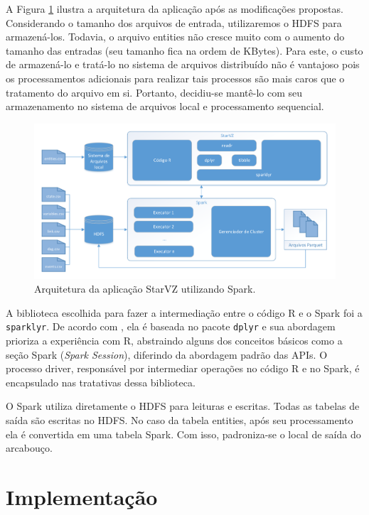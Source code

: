 A Figura \ref{fig:starvz-app-spark} ilustra a arquitetura da aplicação após as 
modificações propostas. Considerando o tamanho dos arquivos de entrada, 
utilizaremos o HDFS para armazená-los. Todavia, o arquivo entities não cresce 
muito com o aumento do tamanho das entradas (seu tamanho fica na ordem de 
KBytes). Para este, o custo de armazená-lo e tratá-lo no sistema de arquivos 
distribuído não é vantajoso pois os processamentos adicionais para realizar tais 
processos são mais caros que o tratamento do arquivo em si. Portanto, decidiu-se 
mantê-lo com seu armazenamento no sistema de arquivos local e processamento 
sequencial.

\begin{figure}[ht]
 \centerline{\includegraphics[width=1\textwidth]{./img/starvz-arch-spark.pdf}}
 \caption{Arquitetura da aplicação StarVZ utilizando Spark.}
 \label{fig:starvz-app-spark}
\end{figure}


A biblioteca escolhida para fazer a intermediação entre o código R e o Spark 
foi a \texttt{sparklyr}. De acordo com \citet{ref:sparkbook}, ela é 
baseada no pacote \texttt{dplyr} e sua abordagem prioriza a experiência com R, 
abstraindo alguns dos conceitos básicos como a seção Spark (\emph{Spark 
Session}), diferindo da abordagem padrão das APIs. O processo driver, 
responsável por intermediar operações no código R e no Spark, é encapsulado nas 
tratativas dessa biblioteca. 

O Spark utiliza diretamente o HDFS para leituras e escritas. Todas as tabelas 
de saída são escritas no HDFS. No caso da tabela entities, após seu 
processamento ela é convertida em uma tabela Spark. Com isso, padroniza-se o 
local de saída do arcabouço.



\section{Implementação} \label{sect:implement}

